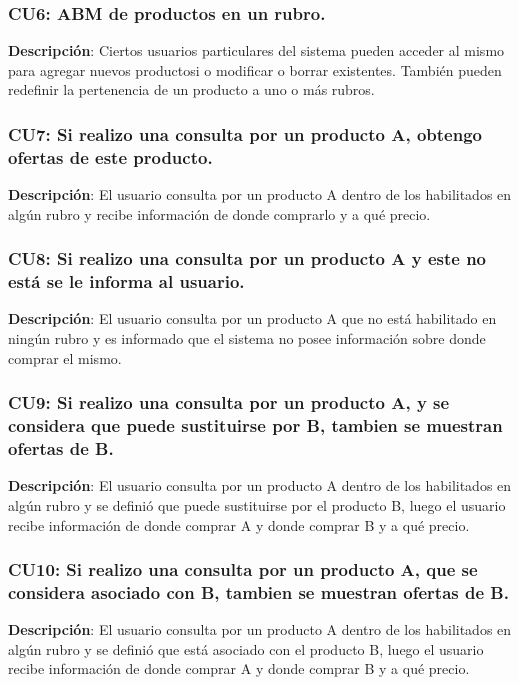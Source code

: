 \subsubsection{CU6: ABM de productos en un rubro.}

\textbf{Descripción}: Ciertos usuarios particulares del sistema pueden
acceder al mismo para agregar nuevos productosi o modificar o borrar
existentes. También pueden redefinir la pertenencia de un producto a uno
o más rubros.

\subsubsection{CU7: Si realizo una consulta por un producto A, obtengo
ofertas de este producto.}

\textbf{Descripción}: El usuario consulta por un producto A dentro de
los habilitados en algún rubro y recibe información de donde comprarlo y
a qué precio.

\subsubsection{CU8: Si realizo una consulta por un producto A y este no
está se le informa al usuario.}

\textbf{Descripción}: El usuario consulta por un producto A que no está
habilitado en ningún rubro y es informado que el sistema no posee
información sobre donde comprar el mismo.

\subsubsection{CU9: Si realizo una consulta por un producto A, y se
considera que puede sustituirse por B, tambien se muestran ofertas de
B.}

\textbf{Descripción}: El usuario consulta por un producto A dentro de
los habilitados en algún rubro y se definió que puede sustituirse por el
producto B, luego el usuario recibe información de donde comprar A y
donde comprar B y a qué precio.

\subsubsection{CU10: Si realizo una consulta por un producto A, que se
considera asociado con B, tambien se muestran ofertas de B.}

\textbf{Descripción}: El usuario consulta por un producto A dentro de
los habilitados en algún rubro y se definió que está asociado con el
producto B, luego el usuario recibe información de donde comprar A y
donde comprar B y a qué precio.

